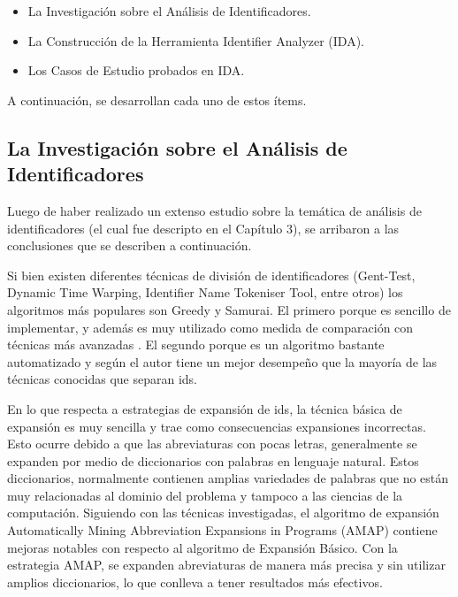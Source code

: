 \begin{itemize}

\item La Investigación sobre el Análisis de Identificadores.

\item La Construcción de la Herramienta Identifier Analyzer (IDA).

\item Los Casos de Estudio probados en IDA.

\end{itemize}

A continuación, se desarrollan cada uno de estos ítems.

\subsection{La Investigación sobre el Análisis de\\ Identificadores}

Luego de haber realizado un extenso estudio sobre la temática de análisis de identificadores (el cual fue descripto en el Capítulo 3), se arribaron a las conclusiones que se describen a continuación.

Si bien existen diferentes técnicas de división de identificadores (Gent-Test, Dynamic Time Warping,  Identifier Name Tokeniser Tool, entre otros) los algoritmos más populares son Greedy y Samurai. El primero porque es sencillo de implementar, y además es muy utilizado como medida de comparación con técnicas más avanzadas \cite{DLFB06,FBL06,HDD06}. El segundo porque es un algoritmo bastante automatizado y según el autor \cite{EHPV09} tiene un mejor desempeño que la mayoría de las técnicas conocidas que separan ids.

En lo que respecta a estrategias de expansión de ids, la técnica básica de expansión es muy sencilla y trae como consecuencias expansiones incorrectas. Esto ocurre debido a que las abreviaturas con pocas letras, generalmente se expanden por medio de diccionarios con palabras en lenguaje natural. Estos diccionarios, normalmente contienen amplias variedades de palabras que no están muy relacionadas al dominio del problema y tampoco a las ciencias de la computación.
Siguiendo con las técnicas investigadas, el algoritmo de expansión Automatically Mining Abbreviation Expansions in Programs (AMAP) \cite{EZH08} contiene mejoras notables con respecto al algoritmo de Expansión Básico. Con la estrategia AMAP, se expanden abreviaturas de manera más precisa y sin utilizar amplios diccionarios, lo que conlleva a tener resultados más efectivos.

